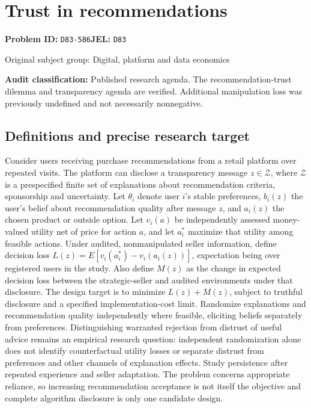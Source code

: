 \documentclass[11pt,a4paper]{article}
\begin{document}
\section*{Trust in recommendations}
\textbf{Problem ID:} \texttt{D83-586}\quad \textbf{JEL:} \texttt{D83}\par
\label{problem:OP-0404}
{\sffamily\small\color{muted}Original subject group: Digital, platform and data economics\par}
\label{definitions:problem:30007686}
\textbf{Audit classification:} Published research agenda. The recommendation-trust dilemma and transparency agenda are verified. Additional manipulation loss was previously undefined and not necessarily nonnegative.
\subsection*{Definitions and precise research target}
Consider users receiving purchase recommendations from a retail platform over repeated visits. The platform can disclose a transparency message \(z\in\mathcal Z\), where \(\mathcal Z\) is a prespecified finite set of explanations about recommendation criteria, sponsorship and uncertainty. Let \(\theta_i\) denote user \(i\)'s stable preferences, \(b_i(z)\) the user's belief about recommendation quality after message \(z\), and \(a_i(z)\) the chosen product or outside option. Let \(v_i(a)\) be independently assessed money-valued utility net of price for action \(a\), and let \(a_i^*\) maximize that utility among feasible actions. Under audited, nonmanipulated seller information, define decision loss \(L(z)=E[v_i(a_i^*)-v_i(a_i(z))]\), expectation being over registered users in the study. Also define \(M(z)\) as the change in expected decision loss between the strategic-seller and audited environments under that disclosure. The design target is to minimize \(L(z)+M(z)\), subject to truthful disclosure and a specified implementation-cost limit. Randomize explanations and recommendation quality independently where feasible, eliciting beliefs separately from preferences. Distinguishing warranted rejection from distrust of useful advice remains an empirical research question: independent randomization alone does not identify counterfactual utility losses or separate distrust from preferences and other channels of explanation effects. Study persistence after repeated experience and seller adaptation. The problem concerns appropriate reliance, so increasing recommendation acceptance is not itself the objective and complete algorithm disclosure is only one candidate design.
\end{document}
